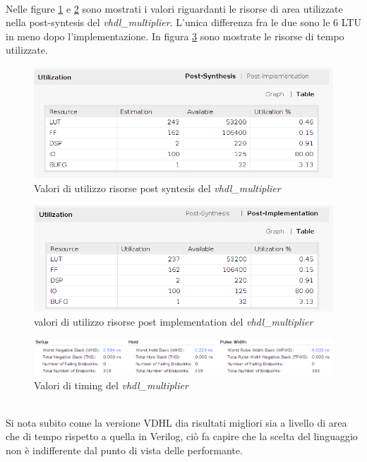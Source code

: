 \documentclass[]{IEEEtran}
\begin{document}
\\Nelle figure \ref{fig:UTIL_SYNT_VHDL} e \ref{fig:UTIL_IMPL_VHDL} sono mostrati i valori riguardanti le risorse di area utilizzate nella post-syntesis del \textit{vhdl\_multiplier}. L'unica differenza fra le due sono le 6 LTU in meno dopo l'implementazione. In figura \ref{fig:TIMING_VHDL} sono mostrate le risorse di tempo utilizzate.
\begin{figure}[!htb]
    \centering
    \includegraphics[width=0.9\linewidth]{figures/util_synt_vhdl}
    \caption{Valori di utilizzo risorse post syntesis del \textit{vhdl\_multiplier}}
    \label{fig:UTIL_SYNT_VHDL}
\end{figure}
\begin{figure}[!htb]
    \centering
    \includegraphics[width=0.9\linewidth]{figures/util_impl_vhdl}
    \caption{valori di utilizzo risorse post implementation del \textit{vhdl\_multiplier}}
    \label{fig:UTIL_IMPL_VHDL}
\end{figure}
\begin{figure}[!htb]
    \centering
    \includegraphics[width=1.0\linewidth]{figures/timing_vhdl}
    \caption{Valori di timing del \textit{vhdl\_multiplier}}
    \label{fig:TIMING_VHDL}
\end{figure}
\\Si nota subito come la versione VDHL dia risultati migliori sia a livello di area che di tempo rispetto a quella in Verilog, ciò fa capire che la scelta del linguaggio non è indifferente dal punto di vista delle performante.
\end{document}
